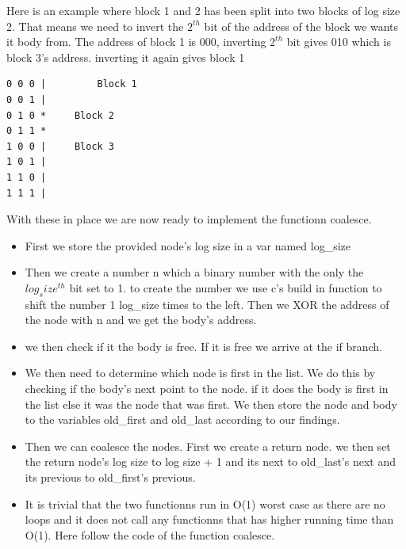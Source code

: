 \documentclass[a4paper,12pt,danish]{report}
\begin{document}
Here is an example where block 1 and 2 has been split into two blocks of log
size 2. That means we need to invert the $2^{th}$ bit of the address of the
block we wants it body from.
The address of block 1 is 000, inverting $2^{th}$ bit gives 010 which is block
3's address. inverting it again gives block 1
\begin{verbatim}
0 0 0 |		    Block 1
0 0 1 |   
0 1 0 *     Block 2
0 1 1 *
1 0 0 |     Block 3
1 0 1 |
1 1 0 |     
1 1 1 |
\end{verbatim}

With these in place we are now ready to implement the functionn coalesce.

\begin{itemize}
  \item First we store the provided node's log size in a var named log\_size
  \item Then we create a number n which a binary number with the only the
  $log_size^{th}$ bit set to 1. to create the number we use c's build in function
  to shift the number 1 log_size times to the left. Then we XOR the address of
  the node with n and we get the body's address.
  \item we then check if it the body is free. If it is free we arrive at the if
  branch.
  \item We then need to determine which node is first in the list. We do this by
  checking if the body's next point to the node. if it does the body is first in
  the list else it was the node that was first. We then store the node and body
  to the variables old\_first and old_last according to our findings.
  \item Then we can coalesce the nodes. First we create a return node. we then
  set the return node's log size to log size + 1 and its next to old\_last's
  next and its previous to old_first's previous.
  \item It is trivial that the two functionns run in O(1) worst case as there
are no loops and it does not call any functionns that has higher
running time than O(1). Here follow the code of the function coalesce.
\end{itemize}
\end{document}
